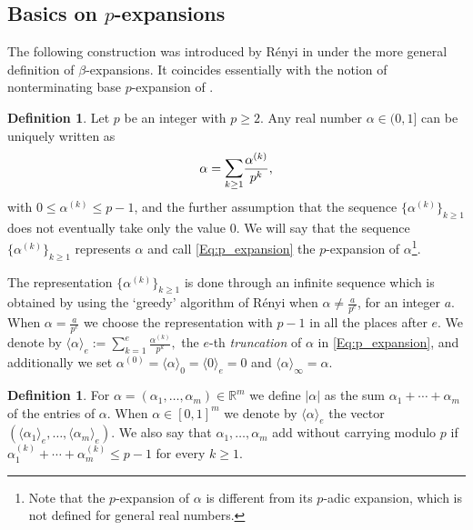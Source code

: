 \documentclass[12pt]{amsart}
\theoremstyle{definition}
\newtheorem{definition}[theorem]{Definition}
\numberwithin{equation}{subsection}
\newcommand{\RR}{\mathbb{R}}
\renewcommand{\!}[1]{{\color{red}\text{\Huge$\star$ }#1}}
\begin{document}
\subsection{Basics on $p$-expansions}
The following construction was introduced by R\'{e}nyi in \cite{Renyi} under the more general definition of $\beta$-expansions. It coincides essentially with the notion of nonterminating base $p$-expansion of \cite[Section 2]{HDpolynomials}.
\begin{definition}
	Let $p$ be an integer with $p\geq2$. Any real number $\alpha\in (0,1]$  can be uniquely written as
		\begin{equation}\label{Eq:p_expansion}
			\alpha=\mathlarger{\sum}_{k\geq 1}\frac{\alpha^{(k)}}{p^{k}},
		\end{equation}
		with $0\leq \alpha^{(k)} \leq p-1$, and the further assumption that the sequence $\{\alpha^{(k)}\}_{k\geq 1}$ does not eventually take only the value 0. We will say that the sequence $\{\alpha^{(k)}\}_{k\geq 1}$ represents $\alpha$ and call \eqref{Eq:p_expansion} the $p$-expansion of $\alpha$\footnote{Note that the $p$-expansion of $\alpha$ is different from its $p$-adic expansion, which is not defined for general real numbers.}.
\end{definition}
The representation $\{\alpha^{(k)}\}_{k\geq 1}$  is done through an infinite sequence which is obtained by using the `greedy' algorithm of R\'{e}nyi when $\alpha\neq \frac{a}{p^e}$, for an integer $a$. When $\alpha=\frac{a}{p^e}$ we choose the representation with $p-1$ in all the places after $e$. We denote by $\langle\alpha\rangle_e:=\sum_{k= 1}^e\frac{\alpha^{(k)}}{p^{k}},$ the $e$-th \textit{truncation} of $\alpha$ in \eqref{Eq:p_expansion}, and additionally we set $\alpha^{(0)}=\langle\alpha\rangle_0=\langle 0\rangle_e=0$ and $\langle\alpha\rangle_\infty=\alpha$.
\begin{definition}
	For $\alpha=(\alpha_1,\ldots,\alpha_m)\in\RR^m$ we define $|\alpha|$ as the sum $\alpha_1+\cdots+\alpha_m$ of the entries of $\alpha$. When $\alpha\in[0,1]^m$ we denote by $\langle\alpha\rangle_e$ the vector $(\langle\alpha_1\rangle_e,\ldots,\langle\alpha_m\rangle_e)$. We also say that $\alpha_1,\ldots,\alpha_m$ add without
	carrying modulo $p$ if $\alpha_1^{(k)}+\cdots+\alpha_m^{(k)}\leq p-1$ for every $k\geq 1$.
\end{definition}
\end{document}
